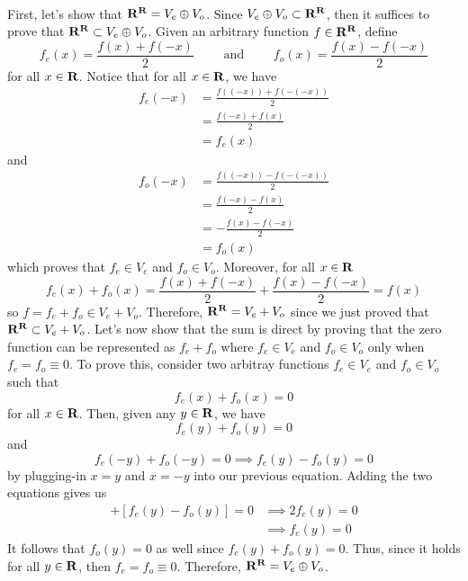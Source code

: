 \begin{solution}
    \\ First, let's show that $\mathbf{R}^{\mathbf{R}} = V_e \oplus V_o$. Since $V_e \oplus V_o \subset \mathbf{R}^{\mathbf{R}}$, then it suffices to prove that $\mathbf{R}^{\mathbf{R}} \subset V_e \oplus V_o$. Given an arbitrary function $f \in \mathbf{R}^{\mathbf{R}}$, define
    $$f_e(x) = \frac{f(x)+f(-x)}{2} \qquad \text{ and } \qquad f_o(x) = \frac{f(x)-f(-x)}{2}$$
    for all $x \in \mathbf{R}$. Notice that for all $x \in \mathbf{R}$, we have
    \begin{align*}
        f_e(-x) &= \frac{f((-x))+f(-(-x))}{2} \\
        &= \frac{f(-x)+f(x)}{2} \\
        &= f_e(x)
    \end{align*}
    and
    \begin{align*}
        f_o(-x) &= \frac{f((-x))-f(-(-x))}{2} \\
        &= \frac{f(-x)-f(x)}{2} \\
        &= -\frac{f(x)-f(-x)}{2} \\
        &= f_o(x)
    \end{align*}
    which proves that $f_e \in V_e$ and $f_o \in V_o$. Moreover, for all $x \in \mathbf{R}$
    $$f_e(x) + f_o(x) = \frac{f(x)+f(-x)}{2} + \frac{f(x)-f(-x)}{2} = f(x)$$
    so $f = f_e + f_o \in V_e + V_o$. Therefore, $\mathbf{R}^{\mathbf{R}} = V_e + V_o$ since we just proved that $\mathbf{R}^{\mathbf{R}} \subset V_e + V_o$. Let's now show that the sum is direct by proving that the zero function can be represented as $f_e + f_o$ where $f_e \in V_e$ and $f_o \in V_o$ only when $f_e = f_o \equiv 0$. To prove this, consider two arbitray functions $f_e \in V_e$ and $f_o \in V_o$ such that
    $$f_e(x) + f_o(x) = 0$$
    for all $x \in \mathbf{R}$. Then, given any $y \in \mathbf{R}$, we have
    $$f_e(y) + f_o(y) = 0$$
    and 
    $$f_e(-y) + f_o(-y) = 0 \implies f_e(y) - f_o(y) = 0$$
    by plugging-in $x=y$ and $x=-y$ into our previous equation. Adding the two equations gives us
    \begin{align*}
        [f_e(y) + f_o(y)] + [f_e(y) - f_o(y)] = 0 &\implies 2f_e(y) = 0 \\
        &\implies f_e(y) = 0
    \end{align*}
    It follows that $f_o(y) = 0$ as well since $f_e(y) + f_o(y) = 0$. Thus, since it holds for all $y \in \mathbf{R}$, then $f_e = f_o \equiv 0$. Therefore, $\mathbf{R}^{\mathbf{R}} = V_e \oplus V_o$.
\end{solution}
